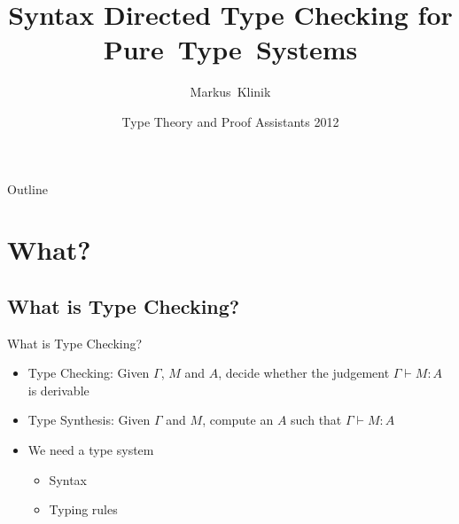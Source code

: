 \documentclass{beamer}
\title
{Syntax Directed Type Checking for Pure~Type~Systems}
\author
{Markus~Klinik}
\institute[Radboud University Nijmegen] %
{
  Radboud University Nijmegen
}
\date
{Type Theory and Proof Assistants 2012}
\begin{document}
\begin{frame}
  \titlepage
\end{frame}

\begin{frame}{Outline}
  \tableofcontents
\end{frame}





\section{What?}

\subsection{What is Type Checking?}


\begin{frame}{What is Type Checking?}

  \begin{itemize}
    \item
      Type Checking: Given $\Gamma$, $M$ and $A$, decide whether the judgement
      $\Gamma \vdash M : A$ is derivable
    \item
      Type Synthesis: Given $\Gamma$ and $M$, compute an $A$ such that $\Gamma
      \vdash M : A$
    \item
      We need a type system
      \begin{itemize}
        \item
          Syntax
        \item
          Typing rules
      \end{itemize}
  \end{itemize}

\end{frame}
\end{document}
